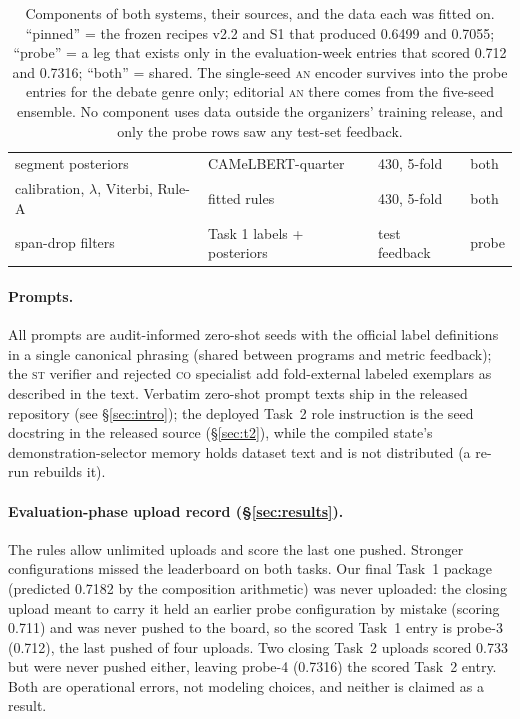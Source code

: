 \documentclass[11pt]{article}
\newcommand{\lab}[1]{\textsc{#1}}
\newcommand{\co}{\lab{co}}
\newcommand{\st}{\lab{st}}
\newcommand{\an}{\lab{an}}
\begin{document}
\begin{table}[h]
\begin{tabular}{p{1.85cm}p{2.15cm}p{1.6cm}l}
segment posteriors & CAMeLBERT-quarter & 430, 5-fold & both \\
calibration, $\lambda$, Viterbi, Rule-A & fitted rules & 430, 5-fold & both \\
span-drop filters & Task 1 labels + posteriors & test feedback & probe \\
\bottomrule
\end{tabular}
\caption{Components of both systems, their sources, and the data each
was fitted on. ``pinned'' = the frozen recipes v2.2 and S1 that produced
0.6499 and 0.7055; ``probe'' = a leg that exists only in the
evaluation-week entries that scored 0.712 and 0.7316; ``both'' = shared.
The single-seed \an{} encoder survives into the probe entries for the
debate genre only; editorial \an{} there comes from the five-seed
ensemble. No component uses data outside the organizers' training
release, and only the probe rows saw any test-set feedback.}
\label{tab:components}
\end{table}

\paragraph{Prompts.} All prompts are audit-informed zero-shot seeds with
the official label definitions in a single canonical phrasing (shared
between programs and metric feedback); the \st{} verifier and rejected
\co{} specialist add fold-external labeled exemplars as described in the
text. Verbatim zero-shot prompt texts ship in the released repository
(see \S\ref{sec:intro}); the deployed Task~2 role instruction is the
seed docstring in the released source (\S\ref{sec:t2}), while the
compiled state's demonstration-selector memory holds dataset text and is
not distributed (a re-run rebuilds it).

\paragraph{Evaluation-phase upload record (\S\ref{sec:results}).}
The rules allow unlimited uploads and score the last one pushed.
Stronger configurations missed the leaderboard on both tasks. Our final
Task~1 package (predicted 0.7182 by the composition arithmetic) was
never uploaded: the closing upload meant to carry it held an earlier
probe configuration by mistake (scoring 0.711) and was never pushed to
the board, so the scored Task~1 entry is probe-3 (0.712), the last
pushed of four uploads. Two closing
Task~2 uploads scored 0.733 but were never pushed either, leaving
probe-4 (0.7316) the scored Task~2 entry. Both are operational errors,
not modeling choices, and neither is claimed as a result.
\end{document}
